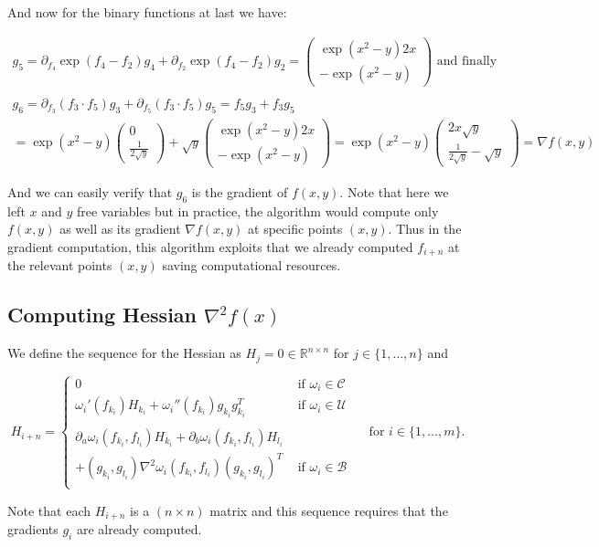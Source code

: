 \documentclass[11pt,a4paper]{article}
\def\R{{\mathbb R}}
\theoremstyle{definition} %
\begin{document}
And now for the binary functions at last we have:

\begin{gather*}
	g_5 =
	\partial_{f_4} \exp (f_4 - f_2) g_4
	+ \partial_{f_2} \exp (f_4 - f_2) g_2
	= \begin{pmatrix}
		\exp (x^2 - y) 2x \\
		- \exp (x^2 - y)
	\end{pmatrix}
	\text{ and finally } \\ \\
	g_6 =
	\partial_{f_3} ( f_3 \cdot f_5 ) g_3 +
	\partial_{f_5} ( f_3 \cdot f_5 ) g_5
	= f_5 g_3 + f_3 g_5 \\
	=
	\exp (x^2 - y) \begin{pmatrix} 0 \\
		\frac{ 1 }{ 2 \sqrt{y} }
	\end{pmatrix}
	+ \sqrt{y}
	\begin{pmatrix}
		\exp (x^2 - y) 2x \\
		- \exp (x^2 - y)
	\end{pmatrix}
	=
	\exp (x^2 - y)
	\begin{pmatrix}
		2x \sqrt{y} \\
		\frac{ 1 }{ 2 \sqrt{y} } - \sqrt{y}
	\end{pmatrix}
	= \nabla f(x, y)
\end{gather*}

And we can easily verify that $g_6$ is the gradient of $f(x,y)$.
Note that here we left $x$ and $y$ free variables but in practice, the
algorithm would compute only $f(x,y)$ as well as its gradient
$\nabla f(x,y)$ at specific points $(x,y)$. Thus in the gradient computation,
this algorithm exploits that we already computed $f_{i+n}$ at the relevant
points $(x,y)$ saving computational resources.

\subsection{Computing Hessian $\nabla^2 f(x)$}

We define the sequence for the Hessian as $H_j = 0 \in \R^{n \times n}$
for
$j \in \{
	1, \ldots, n
	\} $ and

\[
	H_{i+n} = \begin{cases}
		0
		 & \text{ if } \omega_i \in \mathcal{C} \\
		\omega_i ' (f_{k_i}) H_{k_i} + \omega_i '' (f_{k_i})
		g_{k_i}
		g_{k_i} ^T
		 & \text{ if } \omega_i \in \mathcal{U} \\ \\
		\partial_a \omega_i (f_{k_i}, f_{l_i}) H_{k_i} +
		\partial_b \omega_i (f_{k_i}, f_{l_i}) H_{l_i}
		 &                                      \\
		+ (g_{k_i}, g_{l_i}) \nabla ^2 \omega_i (f_{k_i}, f_{l_i})
		(g_{k_i}, g_{l_i})^T
		 & \text{ if } \omega_i \in \mathcal{B} \\
	\end{cases}
	\quad \text{ for }
	i \in \{
	1, \ldots, m
	\}.
\]

Note that each $H_{i+n}$ is a $(n \times n)$ matrix and this sequence
requires that the gradients $g_i$ are already computed.
\end{document}
